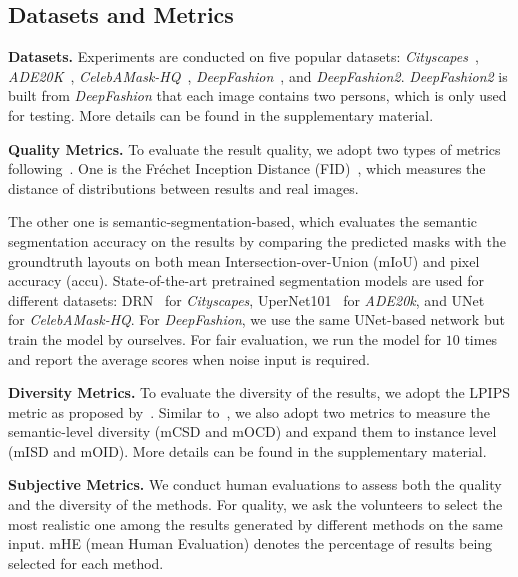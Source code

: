 \documentclass[final]{cvpr}
\begin{document}
\subsection{Datasets and Metrics}
\noindent\textbf{Datasets.} Experiments are conducted on five popular datasets:  \textit{Cityscapes}~\cite{cordts2016cityscapes}, \textit{ADE20K}~\cite{zhou2017scene}, \textit{CelebAMask-HQ}~\cite{lee2020maskgan,karras2017progressive,liu2015deep}, \textit{DeepFashion}~\cite{liu2016deepfashion}, and \textit{DeepFashion2}. 
\textit{DeepFashion2} is built from \textit{DeepFashion} that each image contains two persons, which is only used for testing. More details can be found in the supplementary material.

\noindent\textbf{Quality Metrics.} To evaluate the result quality, we adopt two types of metrics following~\cite{chen2017photographic,wang2018high,park2019semantic,tan2020semantic}. One is the Fr\'echet Inception Distance (FID)~\cite{heusel2017gans}, which measures the distance of distributions between results and real images.

The other one is semantic-segmentation-based, which evaluates the semantic segmentation accuracy on the results by comparing the predicted masks with the groundtruth layouts on both mean Intersection-over-Union (mIoU) and pixel accuracy (accu). State-of-the-art pretrained segmentation models are used for different datasets: DRN~\cite{yu2017dilated,github-drn} for \textit{Cityscapes}, UperNet101~\cite{xiao2018unified,github-upernet} for \textit{ADE20k}, and UNet~\cite{ronneberger2015u,github-celebamask} for \textit{CelebAMask-HQ}. For \textit{DeepFashion}, we use the same UNet-based network but train the model by ourselves. For fair evaluation, we run the model for $10$ times and report the average scores when noise input is required.

\noindent\textbf{Diversity Metrics.} To evaluate the diversity of the results, we adopt the LPIPS metric as proposed by~\cite{zhang2018unreasonable,github-lpips}. Similar to~\cite{zhu2020semantically}, we also adopt two metrics to measure the semantic-level diversity (mCSD and mOCD) and expand them to instance level (mISD and mOID). More details can be found in the supplementary material.

\noindent\textbf{Subjective Metrics.} We conduct human evaluations to assess both the quality and the diversity of the methods. For quality, we ask the volunteers to select the most realistic one among the results generated by different methods on the same input. mHE (mean Human Evaluation) denotes the percentage of results being selected for each method.
\end{document}
